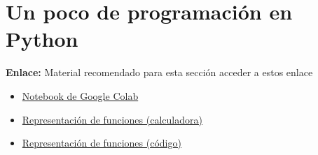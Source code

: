 \documentclass[a4,11pt]{aleph-notas}
\begin{document}
\section{Un poco de programación en Python}


\begin{pycodigo}
    \textbf{Enlace:} Material recomendado para esta sección acceder a estos enlace
    \begin{itemize}
        \item 
        \href{https://colab.research.google.com/drive/1dtsJCBOb-2m2BGXqca7iavwkilENi69B?usp=sharing}{Notebook de Google Colab}
        \item 
        \href{https://colab.research.google.com/github/ECFM-PUCE/Python-Notebooks-Educativos/blob/main/Representacion-funciones-calculadora.ipynb}{Representación de funciones (calculadora)}
        \item 
        \href{https://colab.research.google.com/github/ECFM-PUCE/Python-Notebooks-Educativos/blob/main/Representacion-funciones-codigo.ipynb}{Representación de funciones (código)}
    \end{itemize}
\end{pycodigo}
\end{document}
